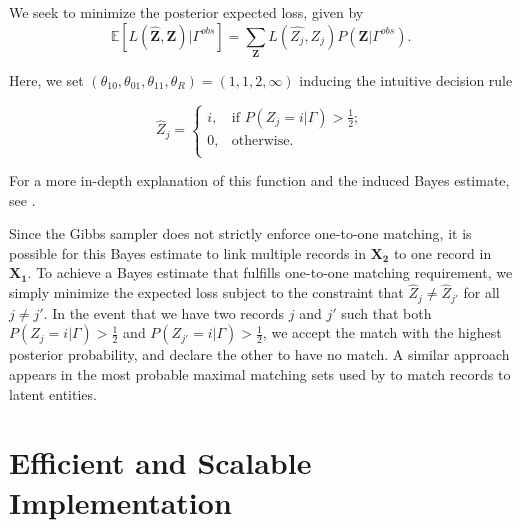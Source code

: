 \documentclass[ba]{imsart}
\begin{document}

We seek to minimize the posterior expected loss, given by 
$$\mathbb{E}[L(\hat{\bm{Z}}, \bm{Z})|\Gamma^{obs}] = \sum_{\bm{Z}} L(\hat{Z_j}, Z_j)P(\bm{Z}|\Gamma^{obs}).$$

Here, we set $(\theta_{10}, \theta_{01}, \theta_{11}, \theta_R) = (1, 1, 2, \infty)$ inducing the intuitive decision rule


\[\hat{Z}_j =\begin{cases} 
	i,  & \text{if } P(Z_j = i |\Gamma) > \frac{1}{2}; \\
	0,  & \text{otherwise}. \\
\end{cases}\]

For a more in-depth explanation of this function and the induced Bayes
estimate, see \cite{sadinle_bayesian_2017}.

Since the Gibbs sampler does not strictly enforce one-to-one matching, it is possible for this Bayes estimate to link multiple records in $\bm{X_2}$ to one record in $\bm{X_1}$. To achieve a Bayes estimate that fulfills one-to-one matching requirement, we simply minimize the expected loss subject to the constraint that $\hat{Z}_j \neq \hat{Z}_{j'}$ for all $j \neq j'$. In the event that we have two records $j$ and $j'$ such that both $P(Z_j = i |\Gamma) > \frac{1}{2}$ and $ P(Z_{j'} = i |\Gamma) > \frac{1}{2}$, we accept the match with the highest posterior probability, and declare the other to have no match. A similar approach appears in the most probable maximal matching sets used by \cite{steorts_bayesian_2016} to match records to latent entities.


\section{Efficient and Scalable Implementation}
\label{sec:efficiency}
\end{document}
